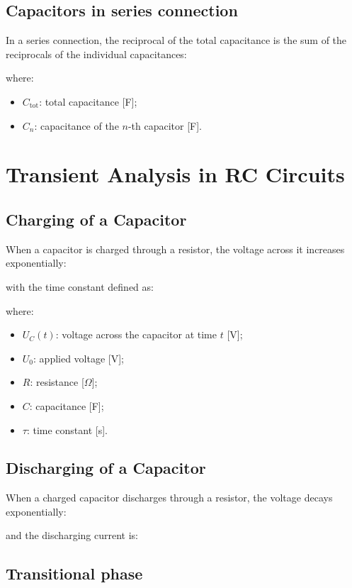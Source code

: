 \documentclass{article}
\begin{document}
\subsection{Capacitors in series connection}
In a series connection, the reciprocal of the total capacitance is the sum of the reciprocals of the individual capacitances:

where:
\begin{itemize}
    \item $C_{\text{tot}}$: total capacitance [F];
    \item $C_n$: capacitance of the $n$-th capacitor [F].
\end{itemize}

\section{Transient Analysis in RC Circuits}
\subsection{Charging of a Capacitor}
When a capacitor is charged through a resistor, the voltage across it increases exponentially:

with the time constant defined as:

where:
\begin{itemize}
    \item $U_C(t)$: voltage across the capacitor at time $t$ [V];
    \item $U_0$: applied voltage [V];
    \item $R$: resistance [$\Omega$];
    \item $C$: capacitance [F];
    \item $\tau$: time constant [s].
\end{itemize}

\subsection{Discharging of a Capacitor}
When a charged capacitor discharges through a resistor, the voltage decays exponentially:

and the discharging current is:

\newpage
\subsection{Transitional phase}
\end{document}
